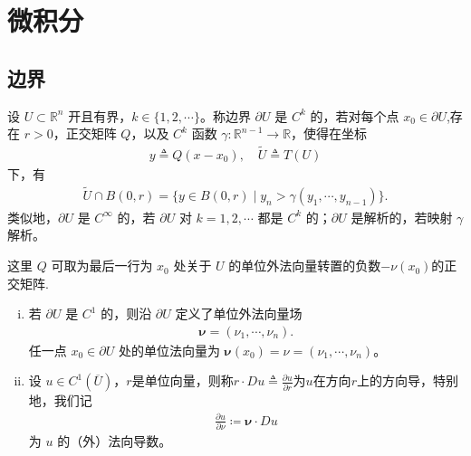 \documentclass[../main.tex]{subfiles}
\begin{document}
\chapter{微积分}\label{chapter:appC-微积分}

\section{边界}\label{section:appC-边界}

\begin{definition}\label{definition:appC-Ck边界}
设 $U\subset\mathbb{R}^n$ 开且有界，$k\in\{1,2,\cdots\}$。称边界 $\partial U$ 是 $C^k$ 的，若对每个点 $x_0\in\partial U$,存在 $r>0$，正交矩阵 $Q$，以及 $C^k$ 函数 $\gamma:\mathbb{R}^{n-1}\to\mathbb{R}$，使得在坐标
\begin{align*}
y\triangleq Q(x-x_0),\quad
\widetilde{U}\triangleq T(U)
\end{align*}
下，有
\begin{align*}
\widetilde{U}\cap B(0,r)=\{y\in B(0,r)\mid y_n>\gamma(y_1,\cdots,y_{n-1})\}.
\end{align*}
类似地，$\partial U$ 是 $C^\infty$ 的，若 $\partial U$ 对 $k=1,2,\cdots$ 都是 $C^k$ 的；$\partial U$ 是解析的，若映射 $\gamma$ 解析。
\end{definition}
\begin{remark}
这里 $Q$ 可取为最后一行为 $x_0$ 处关于 $U$ 的单位外法向量转置的负数$-\nu(x_0)$的正交矩阵.
\end{remark}

\begin{definition}\label{definition:appC-法向量}
\begin{enumerate}[(i)]
\item 若 $\partial U$ 是 $C^1$ 的，则沿 $\partial U$ 定义了单位外法向量场
\begin{align*}
\boldsymbol{\nu}=(\nu_1,\cdots,\nu_n).
\end{align*}
任一点 $x_0\in\partial U$ 处的单位法向量为 $\boldsymbol{\nu}(x_0)=\nu=(\nu_1,\cdots,\nu_n)$。

\item 设 $u\in C^1(\overline{U})$，$r$是单位向量，则称$r\cdot Du\triangleq \frac{\partial u}{\partial r}$为$u$在方向$r$上的方向导，特别地，我们记
\begin{align*}
\frac{\partial u}{\partial\nu}\coloneqq\boldsymbol{\nu}\cdot Du
\end{align*}
为 $u$ 的（外）法向导数。
\end{enumerate}
\end{definition}
\end{document}
